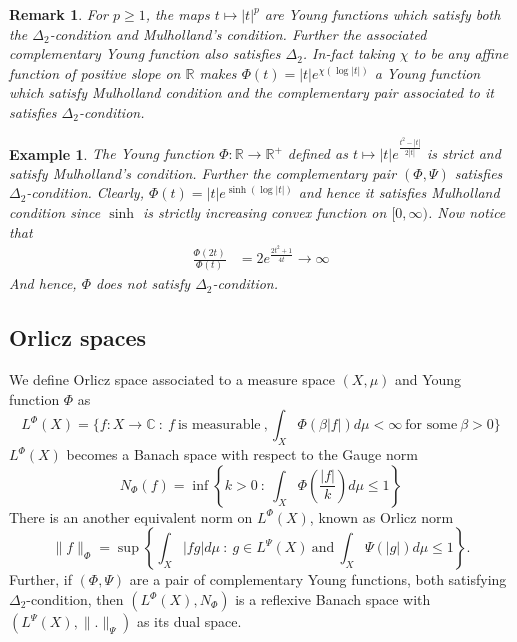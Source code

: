 \documentclass[pdflatex,sn-mathphys-num]{sn-jnl}%
\newtheorem{remark}{Remark}
\theoremstyle{thmstyleone}%
\theoremstyle{thmstyletwo}%
\newtheorem{example}{Example}%
\theoremstyle{thmstylethree}%
\begin{document}
\begin{remark}
	For $p\geq 1$, the maps $t\mapsto |t|^p$ are Young functions which satisfy both the $\Delta_2$-condition and Mulholland's condition. Further the associated complementary Young function  also satisfies $\Delta_2$. In-fact taking $\chi$ to be any affine function of positive slope on $\mathbb R$ makes $\Phi(t)=|t|e^{\chi(\log |t|)}$ a Young function which satisfy Mulholland condition and the complementary pair associated to it satisfies $\Delta_2$-condition.
\end{remark}
\begin{example} The Young function $\Phi:\mathbb R\to \mathbb R^+$ defined as $t\mapsto |t|e^{\frac{t^2-|t|}{2|t|}}$ is strict and satisfy Mulholland's condition. Further the complementary pair $(\Phi,\Psi)$ satisfies $\Delta_2$-condition. Clearly, $\Phi(t)=|t|e^{\sinh (\log|t|)}$ and hence it satisfies  Mulholland condition since $\sinh$ is strictly increasing convex function on $[0,\infty)$. Now notice that \begin{eqnarray*}
	\frac{\Phi(2t)}{\Phi(t)}&=2e^{\frac{2t^2+1}{4t}}\rightarrow \infty
\end{eqnarray*}
And hence, $\Phi$ does not satisfy $\Delta_2$-condition.
\end{example}
\subsection{Orlicz spaces}\label{Orlicz}
We define Orlicz space associated to a measure space $(X,\mu)$ and Young function $\Phi$ as $$L^\Phi(X)=\{f:X\to\mathbb C~:~f~\text{is measurable}~,\int_X\Phi(\beta |f|)d\mu<\infty~\text{for some}~\beta>0\}$$
$L^\Phi(X)$ becomes a Banach space with respect to the  Gauge norm $$N_\Phi(f)=\inf\left\{k>0~:~\int_X\Phi\left(\frac{|f|}{k}\right)d\mu\leq 1\right\}$$
There is an another equivalent norm on $L^\Phi(X)$, known as Orlicz norm $$\|f\|_\Phi=\sup\left\{\int_X|fg|d\mu~:~g\in L^\Psi(X)~\text{and}~\int_X\Psi(|g|)d\mu\leq 1\right\}.$$
Further, if $(\Phi,\Psi)$ are a pair of complementary Young functions, both satisfying $\Delta_2$-condition, then $\left(L^\Phi(X), N_\Phi\right)$ is a reflexive Banach space with  $\left(L^\Psi(X),\|.\|_\Psi\right)$ as its dual space.
\end{document}
